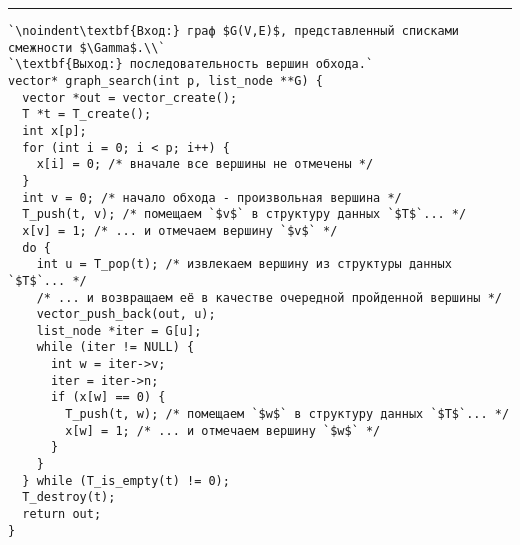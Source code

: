 \vspace{5pt} \hrule
\begin{lstlisting}[caption={Поиск в ширину и в глубину}, label=p258_graph_search, escapechar=`]
`\noindent\textbf{Вход:} граф $G(V,E)$, представленный списками смежности $\Gamma$.\\`
`\textbf{Выход:} последовательность вершин обхода.`
vector* graph_search(int p, list_node **G) {
  vector *out = vector_create();
  T *t = T_create();
  int x[p];
  for (int i = 0; i < p; i++) {
    x[i] = 0; /* вначале все вершины не отмечены */
  }
  int v = 0; /* начало обхода - произвольная вершина */
  T_push(t, v); /* помещаем `$v$` в структуру данных `$T$`... */
  x[v] = 1; /* ... и отмечаем вершину `$v$` */
  do {
    int u = T_pop(t); /* извлекаем вершину из структуры данных `$T$`... */
    /* ... и возвращаем её в качестве очередной пройденной вершины */
    vector_push_back(out, u);
    list_node *iter = G[u];
    while (iter != NULL) {
      int w = iter->v;
      iter = iter->n;
      if (x[w] == 0) {
        T_push(t, w); /* помещаем `$w$` в структуру данных `$T$`... */
        x[w] = 1; /* ... и отмечаем вершину `$w$` */
      }
    }
  } while (T_is_empty(t) != 0);
  T_destroy(t);
  return out;
}
\end{lstlisting}
